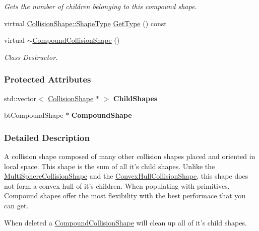 \begin{DoxyCompactItemize}
\begin{DoxyCompactList}\small\item\em Gets the number of children belonging to this compound shape. \item\end{DoxyCompactList}\item 
virtual \hyperlink{classphys_1_1CollisionShape_af3ba4fd8af5b9557f912d2f5ff35a588}{CollisionShape::ShapeType} \hyperlink{classphys_1_1CompoundCollisionShape_a10bbe1a6ce849dc40e2ca5dc2b68cbff}{GetType} () const 
\item 
\hypertarget{classphys_1_1CompoundCollisionShape_a6e97772fb1395554ca9e729c7fcc0a00}{
virtual \hyperlink{classphys_1_1CompoundCollisionShape_a6e97772fb1395554ca9e729c7fcc0a00}{$\sim$CompoundCollisionShape} ()}
\label{classphys_1_1CompoundCollisionShape_a6e97772fb1395554ca9e729c7fcc0a00}

\begin{DoxyCompactList}\small\item\em Class Destructor. \item\end{DoxyCompactList}\end{DoxyCompactItemize}
\subsubsection*{Protected Attributes}
\begin{DoxyCompactItemize}
\item 
\hypertarget{classphys_1_1CompoundCollisionShape_accc3f3f7dbf9dbc5fec69de718590f5e}{
std::vector$<$ \hyperlink{classphys_1_1CollisionShape}{CollisionShape} $\ast$ $>$ {\bfseries ChildShapes}}
\label{classphys_1_1CompoundCollisionShape_accc3f3f7dbf9dbc5fec69de718590f5e}

\item 
\hypertarget{classphys_1_1CompoundCollisionShape_a69262688643b8f83cbde52023074d725}{
btCompoundShape $\ast$ {\bfseries CompoundShape}}
\label{classphys_1_1CompoundCollisionShape_a69262688643b8f83cbde52023074d725}

\end{DoxyCompactItemize}


\subsubsection{Detailed Description}
A collision shape composed of many other collision shapes placed and oriented in local space. This shape is the sum of all it's child shapes. Unlike the \hyperlink{classphys_1_1MultiSphereCollisionShape}{MultiSphereCollisionShape} and the \hyperlink{classphys_1_1ConvexHullCollisionShape}{ConvexHullCollisionShape}, this shape does not form a convex hull of it's children. When populating with primitives, Compound shapes offer the most flexibility with the best performace that you can get. \par
 \par
 When deleted a \hyperlink{classphys_1_1CompoundCollisionShape}{CompoundCollisionShape} will clean up all of it's child shapes. 

